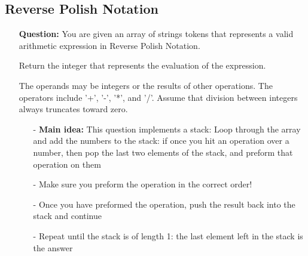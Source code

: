\documentclass[12pt]{article}
\begin{document}
\subsection{Reverse Polish Notation}
\begin{enumerate}
  \item[] \textbf{Question:} You are given an array of strings tokens that represents a valid arithmetic expression in Reverse Polish Notation.

Return the integer that represents the evaluation of the expression.

The operands may be integers or the results of other operations.
The operators include '+', '-', '*', and '/'.
Assume that division between integers always truncates toward zero.

    \begin{enumerate}
      \item[-] \textbf{Main idea:} This question implements a stack: Loop through the array and add the numbers to the stack: if once you hit an operation over a number, then pop the last two elements of the stack, and preform that operation on them
      \item[-] Make sure you preform the operation in the correct order!
      \item[-] Once you have preformed the operation, push the result back into the stack and continue 
      \item[-] Repeat until the stack is of length 1: the last element left in the stack is the answer
    \end{enumerate}
\end{enumerate}
\end{document}
